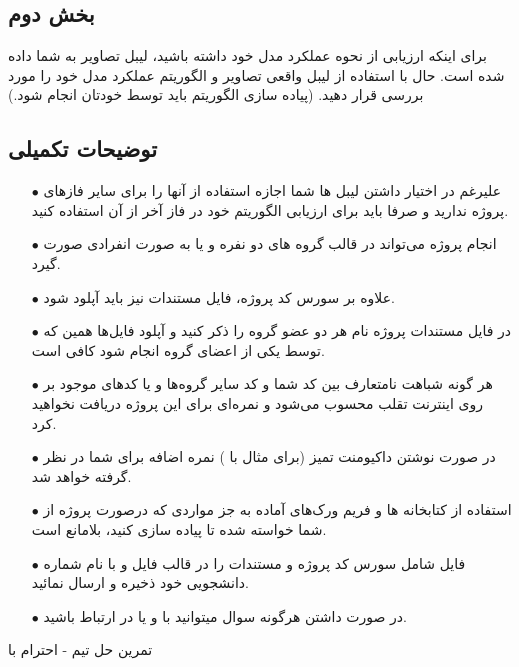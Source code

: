\documentclass{article}
\begin{document}
	\subsection{بخش دوم}
	برای اینکه ارزیابی از نحوه عملکرد مدل خود داشته باشید، لیبل تصاویر به شما داده شده است. حال با استفاده از لیبل واقعی تصاویر و الگوریتم  عملکرد مدل خود را مورد بررسی قرار دهید. (پیاده سازی الگوریتم  باید توسط خودتان انجام شود.)
	
	\subsection*{توضیحات تکمیلی}
	\begin{itemize}
		\item [$\bullet$] علیرغم در اختیار داشتن لیبل ها شما اجازه استفاده از آنها را برای سایر فاز‌های پروژه ندارید و صرفا باید برای ارزیابی الگوریتم خود در فاز آخر از آن استفاده کنید. 
		
		\item [$\bullet$] انجام پروژه می‌تواند در قالب گروه های دو نفره و یا به صورت انفرادی صورت گیرد.
		
		\item [$\bullet$] علاوه بر سورس کد پروژه، فایل مستندات  نیز باید آپلود شود.
		
		\item [$\bullet$] در فایل مستندات پروژه نام هر دو عضو گروه را ذکر کنید و آپلود فایل‌ها همین که توسط یکی از اعضای گروه انجام شود کافی است.
		
		\item [$\bullet$] هر گونه شباهت نامتعارف بین کد شما و کد سایر گروه‌ها و یا کدها‌ی موجود بر روی اینترنت تقلب محسوب می‌شود و نمره‌ای برای این پروژه دریافت نخواهید کرد.
		
		\item [$\bullet$] در صورت نوشتن داکیومنت تمیز (برای مثال با \lr{\LaTeX}) نمره اضافه برای شما در نظر گرفته خواهد شد.
		
		\item [$\bullet$] استفاده از کتابخانه ها و فریم ورک‌های آماده به جز مواردی که درصورت پروژه از شما خواسته شده تا پیاده سازی کنید، بلامانع است.
		
		\item [$\bullet$] فایل شامل سورس کد پروژه و مستندات را در قالب فایل  و با نام شماره دانشجویی خود ذخیره و ارسال نمائید.
		
				\item [$\bullet$] در صورت داشتن هرگونه سوال میتوانید با  و یا  در ارتباط باشید.
				\newline
	\end{itemize}
	
	\begin{LTR}
		
		تمرین حل تیم - احترام با
	\end{LTR}
		

	
\end{document}
